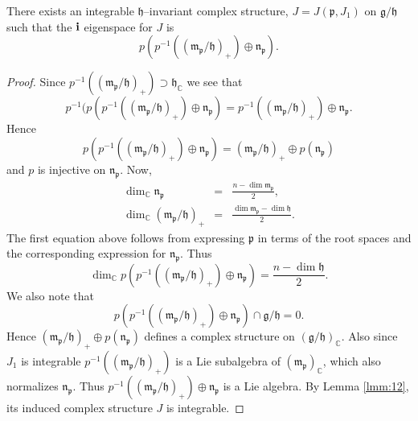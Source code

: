 \documentclass{amse-new}
\numberwithin{equation}{section} %
\begin{document}
\begin{proposition}
\label{prop:21} There exists an integrable $\mathfrak{h}$--invariant complex
structure, $J=J(\mathfrak{p},J_{1})$ on $\mathfrak{g}/\mathfrak{h}$ such that
the ${\bf{i}}$ eigenspace for $J$ is
\[
p\left(p^{-1}\left(  (\mathfrak{m}_{\mathfrak{p}}/\mathfrak{h})  _{+}\right)%
\oplus\mathfrak{n}_{\mathfrak{p}}\right).
\]

\end{proposition}

\begin{proof}
Since $p^{-1}\left( ( \mathfrak{m}_{\mathfrak{p}}/\mathfrak{h})
_{+}\right)\supset\mathfrak{h}_{\mathbb{C}}$ we see that $$p^{-1}(p(p^{-1}\left((
\mathfrak{m}_{\mathfrak{p}}/\mathfrak{h})  _{+}\right)\oplus\mathfrak{n}%
_{\mathfrak{p}})=p^{-1}\left( ( \mathfrak{m}_{\mathfrak{p}}/\mathfrak{h}%
)  _{+}\right)\oplus\mathfrak{n}_{\mathfrak{p}}.$$ Hence%
\[
p\left(p^{-1}\left(  (\mathfrak{m}_{\mathfrak{p}}/\mathfrak{h})  _{+}\right)%
\oplus\mathfrak{n}_{\mathfrak{p}}\right)=\left(  \mathfrak{m}_{\mathfrak{p}%
}/\mathfrak{h}\right)  _{+}\oplus p(\mathfrak{n}_{\mathfrak{p}})
\]
and $p$ is injective on $\mathfrak{n}_{\mathfrak{p}}$. Now,
\begin{eqnarray*}
\dim_{\mathbb{C}}\mathfrak{n}_{\mathfrak{p}}&=&\frac{n-\dim\mathfrak{m}%
_{\mathfrak{p}}}{2},\\
  \dim_{\mathbb{C}}\left(  \mathfrak{m}_{\mathfrak{p}}/\mathfrak{h}\right)_{+}&=&\frac{\dim\mathfrak{m}_{\mathfrak{p}}%
-\dim\mathfrak{h}}{2}.
\end{eqnarray*}
The first equation above follows from expressing $\mathfrak{p}$ in terms of the root spaces and the corresponding expression for $\mathfrak{n}_{\mathfrak{p}}$.
Thus
\[
\dim_{\mathbb{C}}p\left(p^{-1}\left( ( \mathfrak{m}_{\mathfrak{p}}/\mathfrak{h}%
)  _{+}\right)\oplus\mathfrak{n}_{\mathfrak{p}}\right)=\frac{n-\dim\mathfrak{h}}{2}.
\]
We also note that %
\[
p\left(p^{-1}\left( ( \mathfrak{m}_{\mathfrak{p}}/\mathfrak{h})  _{+}\right) \oplus \mathfrak{n}_{\mathfrak{p}}\right)\cap\mathfrak{g}/\mathfrak{h}=0.
\]
Hence $\left(\mathfrak{m}_{\mathfrak{p}}/\mathfrak{h}\right)_{+}\oplus p(\mathfrak{n}_{\mathfrak{p}})$ defines a complex structure on $(\mathfrak{g}/\mathfrak{h})_\mathbb{C}$.
Also since $J_1$ is integrable $p^{-1}\left((\mathfrak{m}_{\mathfrak{p}}/\mathfrak{h})_{+}\right)$ is a Lie subalgebra of $(\mathfrak{m}_\mathfrak{p})_{\mathbb{C}}$, which also normalizes $\mathfrak{n}_{\mathfrak{p}}$.
Thus  $p^{-1}\left((\mathfrak{m}_{\mathfrak{p}}/\mathfrak{h})_{+}\right) \oplus \mathfrak{n}_{\mathfrak{p}}$ is a Lie algebra. By  Lemma \ref{lmm:12},  its induced complex structure $J$ is integrable.
\end{proof}
\end{document}

